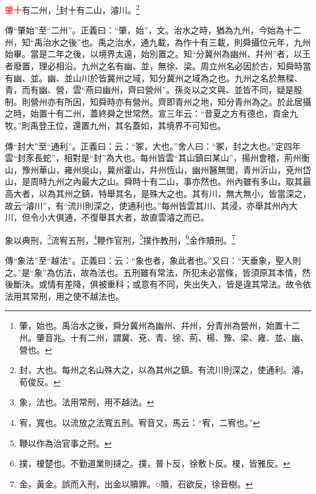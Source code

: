 \textcolor{red}{肇十}有二州，\footnote{肇，始也。禹治水之後，舜分冀州為幽州、幷州，分青州為營州，始置十二州。肇音兆。十有二州，謂冀、兗、青、徐、荊、楊、豫、梁、雍、並、幽、營也。}封十有二山，濬川。\footnote{封，大也。每州之名山殊大之，以為其州之鎮。有流川則深之，使通利。濬，荀俊反。}

{\noindent\zhuan{}\fzbyks 傳“肇始”至“二州”。正義曰：“肇，始”，文。治水之時，猶為九州，今始為十二州，知“禹治水之後”也。禹之治水，通九載，為作十有三載，則舜攝位元年，九州始畢。當是二年之後，以境界太遠，始別置之。知“分冀州為幽州、幷州”者，以王者廢置，理必相沿。九州之名有幽、並，無徐、梁。周立州名必因於古，知舜時當有幽、並。幽、並山川於皆冀州之域，知分冀州之域為之也。九州之名於無樑、青，而有幽、營，雲“燕曰幽州，齊曰營州”。孫炎以之文與、並皆不同，疑是殷制。則營州亦有所因，知舜時亦有營州。齊即青州之地，知分青州為之。於此居攝之時，始置十有二州，蓋終舜之世常然。宣三年云：“昔夏之方有德也，貢金九牧。”則禹登王位，還置九州，其名蓋如，其境界不可知也。 \par}

{\noindent\zhuan{}\fzbyks 傳“封大”至“通利”。正義曰：云：“冢，大也。”舍人曰：“冢，封之大也。”定四年雲“封豕長蛇”，相對是“封”為大也。每州皆雲“其山鎮曰某山”，揚州會稽，荊州衡山，豫州華山，雍州吳山，冀州霍山，幷州恆山，幽州醫無閭，青州沂山，兗州岱山，是周時九州之內最大之山。舜時十有二山，事亦然也。州內雖有多山，取其最高大者，以為其州之鎮，特舉其名，是殊大之也。其有川，無大無小，皆當深之，故云“濬川”，有“流川則深之，使通利也。”每州皆雲其川、其浸，亦舉其州內大川，但令小大俱通，不復舉其大者，故直雲濬之而已。 \par}

象以典刑，\footnote{象，法也。法用常刑，用不越法。}流宥五刑，\footnote{宥，寬也。以流放之法寬五刑。宥音又，馬云：“宥，二宥也。”}鞭作官刑，\footnote{鞭以作為治官事之刑。}撲作教刑，\footnote{撲，榎楚也。不勤道業則撻之。撲，普卜反，徐敷卜反。榎，皆雅反。}金作贖刑。\footnote{金，黃金。誤而入刑，出金以贖罪。○贖，石欲反，徐音樹。}

{\noindent\zhuan{}\fzbyks 傳“象法”至“越法”。正義曰：云：“象也者，象此者也。”又曰：“天垂象，聖人則之。”是“象”為仿法，故為法也。五刑雖有常法，所犯未必當條，皆須原其本情，然後斷決。或情有差降，俱被重科；或意有不同，失出失入，皆是違其常法。故令依法用其常刑，用之使不越法也。 \par}

